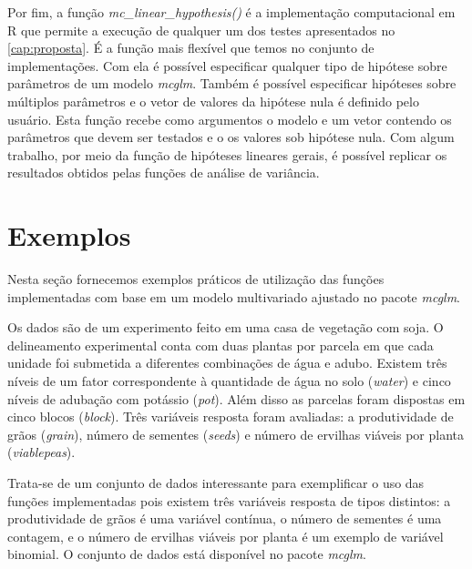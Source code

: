 Por fim, a função \emph{mc\_linear\_hypothesis()} é a implementação computacional em R que permite a execução de qualquer um dos testes apresentados no \autoref{cap:proposta}. É a função mais flexível que temos no conjunto de implementações. Com ela é possível especificar qualquer tipo de hipótese sobre parâmetros de um modelo \emph{mcglm}. Também é possível especificar hipóteses sobre múltiplos parâmetros e o vetor de valores da hipótese nula é definido pelo usuário. Esta função recebe como argumentos o modelo e um vetor contendo os parâmetros que devem ser testados e o os valores sob hipótese nula. Com algum trabalho, por meio da função de hipóteses lineares gerais, é possível replicar os resultados obtidos pelas funções de análise de variância.



\section{Exemplos}

Nesta seção fornecemos exemplos práticos de utilização das funções implementadas com base em um modelo multivariado ajustado no pacote \emph{mcglm}.

Os dados são de um experimento feito em uma casa de vegetação com soja. O delineamento experimental conta com duas plantas por parcela em que cada unidade foi submetida a diferentes combinações de água e adubo. Existem três níveis de um fator correspondente à quantidade de água no solo (\emph{water}) e cinco níveis de adubação com potássio (\emph{pot}). Além disso as parcelas foram dispostas em cinco blocos (\emph{block}). Três variáveis resposta foram avaliadas: a produtividade de grãos (\emph{grain}), número de sementes (\emph{seeds}) e número de ervilhas viáveis por planta (\emph{viablepeas}).

Trata-se de um conjunto de dados interessante para exemplificar o uso das funções implementadas pois existem três variáveis resposta de tipos distintos: a produtividade de grãos é uma variável contínua, o número de sementes é uma contagem, e o número de ervilhas viáveis por planta é um exemplo de variável binomial. O conjunto de dados está disponível no pacote \emph{mcglm}.



\begin{knitrout}
\color{fgcolor}\begin{kframe}
\begin{alltt}
\end{alltt}
\end{kframe}
\end{knitrout}


